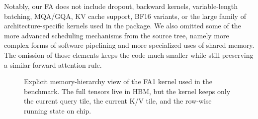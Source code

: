 \documentclass{article}
\begin{document}
Notably, our FA does not include dropout, backward kernels, variable-length batching, MQA/GQA, KV cache support, BF16 variants, or the large family of architecture-specific kernels used in the package. We also omitted some of the more advanced scheduling mechanisms from the source tree, namely more complex forms of software pipelining and more specialized uses of shared memory. The omission of those elements keeps the code much smaller while still preserving a similar forward attention rule.

\begin{figure}[H]
    \centering
    \caption{Explicit memory-hierarchy view of the FA1 kernel used in the benchmark. The full tensors live in HBM, but the kernel keeps only the current query tile, the current K/V tile, and the row-wise running state on chip.}
    \label{fig:hbm_sram_map}
\end{figure}
\end{document}
